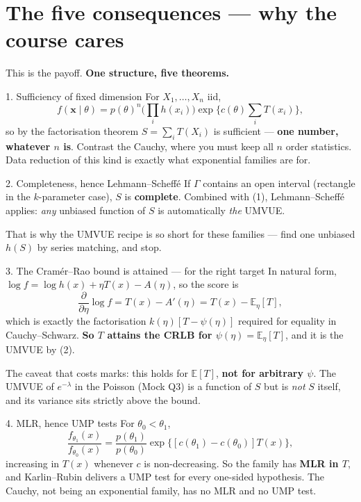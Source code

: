 \documentclass[11pt]{article}
\newcommand{\E}{\mathbb{E}}
\begin{document}
\section{The five consequences --- why the course cares}

This is the payoff. \textbf{One structure, five theorems.}

\begin{idea}{1. Sufficiency of fixed dimension}
For $X_1,\dots,X_n$ iid,
\[
f(\mathbf x\mid\theta)=p(\theta)^{n}\Big(\prod_ih(x_i)\Big)
\exp\Big\{c(\theta)\sum_iT(x_i)\Big\},
\]
so by the factorisation theorem $S=\sum_iT(X_i)$ is sufficient --- \textbf{one number,
whatever $n$ is}. Contrast the Cauchy, where you must keep all $n$ order statistics. Data
reduction of this kind is exactly what exponential families are for.
\end{idea}

\begin{idea}{2. Completeness, hence Lehmann--Scheff\'e}
If $\Gamma$ contains an open interval (rectangle in the $k$-parameter case), $S$ is
\textbf{complete}. Combined with (1), Lehmann--Scheff\'e applies: \emph{any} unbiased function
of $S$ is automatically \emph{the} UMVUE.

That is why the UMVUE recipe is so short for these families --- find one unbiased $h(S)$ by
series matching, and stop.
\end{idea}

\begin{idea}{3. The Cram\'er--Rao bound is attained --- for the right target}
In natural form, $\log f=\log h(x)+\eta T(x)-A(\eta)$, so the score is
\[
\frac{\partial}{\partial\eta}\log f=T(x)-A'(\eta)=T(x)-\E_\eta[T],
\]
which is exactly the factorisation $k(\eta)[T-\psi(\eta)]$ required for equality in
Cauchy--Schwarz. \textbf{So $T$ attains the CRLB for $\psi(\eta)=\E_\eta[T]$}, and it is the
UMVUE by (2).

The caveat that costs marks: this holds for $\E[T]$, \textbf{not for arbitrary $\psi$}. The
UMVUE of $e^{-\lambda}$ in the Poisson (Mock Q3) is a function of $S$ but is \emph{not} $S$
itself, and its variance sits strictly above the bound.
\end{idea}

\begin{idea}{4. MLR, hence UMP tests}
For $\theta_0<\theta_1$,
\[
\frac{f_{\theta_1}(x)}{f_{\theta_0}(x)}
=\frac{p(\theta_1)}{p(\theta_0)}\exp\big\{[c(\theta_1)-c(\theta_0)]T(x)\big\},
\]
increasing in $T(x)$ whenever $c$ is non-decreasing. So the family has \textbf{MLR in $T$},
and Karlin--Rubin delivers a UMP test for every one-sided hypothesis. The Cauchy, not being an
exponential family, has no MLR and no UMP test.
\end{idea}
\end{document}
